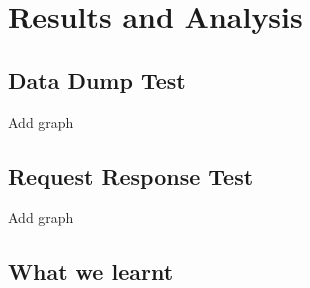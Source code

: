 \chapter{Results and Analysis}

\section{Data Dump Test}

Add graph

\section{Request Response Test}

Add graph

\section{What we learnt}